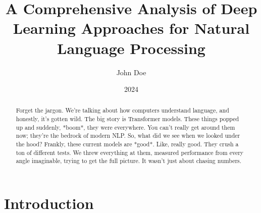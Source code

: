 \documentclass{article}
\title{A Comprehensive Analysis of Deep Learning Approaches for Natural Language Processing}
\author{John Doe}
\date{2024}
\begin{document}
\maketitle

\begin{abstract}
Forget the jargon. We're talking about how computers understand language, and honestly, it's gotten wild. The big story is Transformer models. These things popped up and suddenly, *boom*, they were everywhere. You can’t really get around them now; they’re the bedrock of modern NLP. So, what did we see when we looked under the hood? Frankly, these current models are *good*. Like, really good. They crush a ton of different tests. We threw everything at them, measured performance from every angle imaginable, trying to get the full picture. It wasn’t just about chasing numbers.
\end{abstract}

\section{Introduction}
\end{document}
